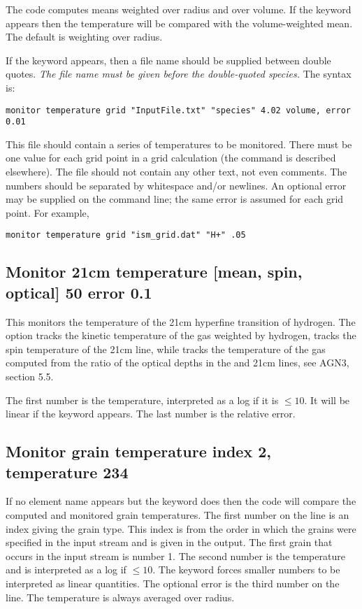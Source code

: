 The code computes means weighted over radius and over volume.
If the keyword  appears then the temperature will
be compared with the volume-weighted mean.
The default is weighting over radius.

If the keyword  appears, then a file name should be supplied
between double quotes.
\textit{The file name must be given before the double-quoted species.}
The syntax is:
%
\begin{verbatim}
monitor temperature grid "InputFile.txt" "species" 4.02 volume, error 0.01
\end{verbatim}
%
This file should contain a series of temperatures to be monitored.
There must be one value for each grid point in a grid calculation
(the  command is described elsewhere). The file should not contain
any other text, not even comments. The numbers should be separated by whitespace
and/or newlines.
An optional error may be supplied on the command line; the same error is
assumed for each grid point.
For example,
%
\begin{verbatim}
monitor temperature grid "ism_grid.dat" "H+" .05
\end{verbatim}
%

\subsection{Monitor 21cm temperature [mean, spin, optical] 50 error 0.1}

This monitors the temperature of the 21cm hyperfine transition of hydrogen.
The  option tracks the kinetic temperature of the gas
weighted by hydrogen,  tracks the spin temperature of the 21cm line,
while  tracks the temperature of the gas computed from the ratio
of the optical depths in the \la{} and 21cm lines, see AGN3, section 5.5.

The first number is the temperature, interpreted as a log if
it is $\le 10$.
It will be linear if the keyword  appears.
The last number is the relative error.

\subsection{Monitor grain temperature index 2, temperature  234}

If no element name appears but the keyword 
does then the code
will compare the computed and monitored grain temperatures.
The first number
on the line is an index giving the grain type.
This index is from the order
in which the grains were specified in the input stream and
is given in the output.
The first grain that occurs in the input stream is number 1.
The
second number is the temperature and is interpreted as a
log if $\le 10$.
The
 keyword forces smaller numbers to be
interpreted as linear quantities.
The optional error is the third number on the line.
The temperature is
always averaged over radius.

